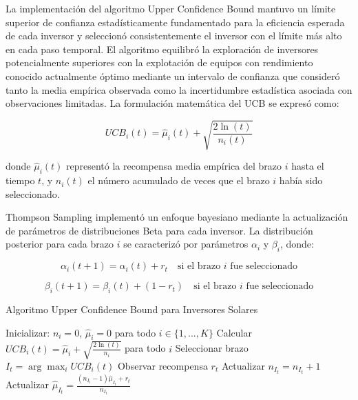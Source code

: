 \documentclass[12pt,a4paper]{article}
\begin{document}
La implementación del algoritmo Upper Confidence Bound mantuvo un límite superior de confianza estadísticamente fundamentado para la eficiencia esperada de cada inversor y seleccionó consistentemente el inversor con el límite más alto en cada paso temporal. El algoritmo equilibró la exploración de inversores potencialmente superiores con la explotación de equipos con rendimiento conocido actualmente óptimo mediante un intervalo de confianza que consideró tanto la media empírica observada como la incertidumbre estadística asociada con observaciones limitadas. La formulación matemática del UCB se expresó como:

\begin{equation}
UCB_i(t) = \hat{\mu}_i(t) + \sqrt{\frac{2 \ln(t)}{n_i(t)}}
\end{equation}

donde $\hat{\mu}_i(t)$ representó la recompensa media empírica del brazo $i$ hasta el tiempo $t$, y $n_i(t)$ el número acumulado de veces que el brazo $i$ había sido seleccionado.

Thompson Sampling implementó un enfoque bayesiano mediante la actualización de parámetros de distribuciones Beta para cada inversor. La distribución posterior para cada brazo $i$ se caracterizó por parámetros $\alpha_i$ y $\beta_i$, donde:

\begin{equation}
\alpha_i(t+1) = \alpha_i(t) + r_t \quad \text{si el brazo } i \text{ fue seleccionado}
\end{equation}

\begin{equation}
\beta_i(t+1) = \beta_i(t) + (1-r_t) \quad \text{si el brazo } i \text{ fue seleccionado}
\end{equation}

\begin{algorithm}
\caption{Algoritmo Upper Confidence Bound para Inversores Solares}
\begin{algorithmic}[1]
\STATE Inicializar: $n_i = 0$, $\hat{\mu}_i = 0$ para todo $i \in \{1, ..., K\}$
\STATE Calcular $UCB_i(t) = \hat{\mu}_i + \sqrt{\frac{2 \ln(t)}{n_i}}$ para todo $i$
\STATE Seleccionar brazo $I_t = \arg \max_i UCB_i(t)$
\STATE Observar recompensa $r_t$
\STATE Actualizar $n_{I_t} = n_{I_t} + 1$
\STATE Actualizar $\hat{\mu}_{I_t} = \frac{(n_{I_t}-1)\hat{\mu}_{I_t} + r_t}{n_{I_t}}$
\ENDFOR
\end{algorithmic}
\end{algorithm}
\end{document}
